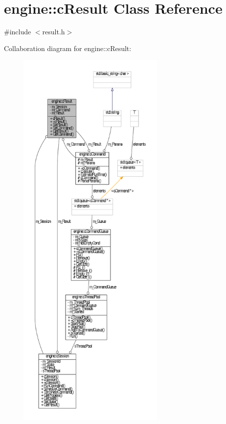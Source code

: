 \hypertarget{classengine_1_1cResult}{\section{engine\-:\-:c\-Result \-Class \-Reference}
\label{classengine_1_1cResult}
}


{\ttfamily \#include $<$result.\-h$>$}



\-Collaboration diagram for engine\-:\-:c\-Result\-:\nopagebreak
\begin{figure}[H]
\begin{center}
\leavevmode
\includegraphics[height=550pt]{classengine_1_1cResult__coll__graph}
\end{center}
\end{figure}
